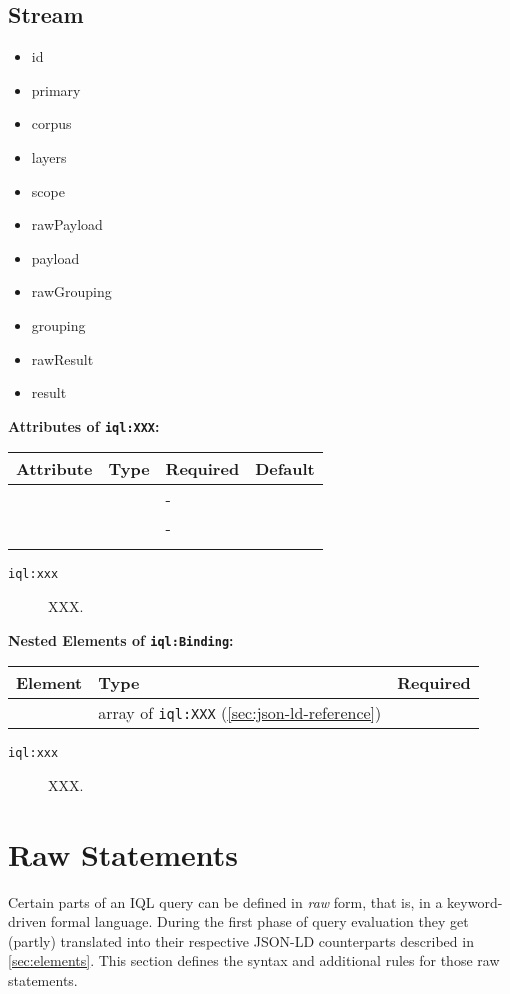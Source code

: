 \documentclass[11pt]{article}
\newcommand{\iql}{IQL\xspace}
\newcommand{\iqlns}{iql:}
\newcommand{\iqlType}[1]{\texttt{\iqlns#1}}
\newcommand{\attributes}[1]{\noindent\textbf{Attributes of \iqlType{#1}:}\newline\medskip}
\newcommand{\elements}[1]{\noindent\textbf{Nested Elements of \iqlType{#1}:}\newline\medskip}
\begin{document}
\subsection{Stream}
\label{sec:json-ld-stream}
\begin{itemize}
	\item id
	\item primary
	\item corpus
	\item layers
	\item scope
	\item rawPayload
	\item payload
	\item rawGrouping
	\item grouping
	\item rawResult
	\item result
\end{itemize}
\attributes{XXX}
\begin{tabular}{|p{}|p{}|p{}|p{}|}
	\hline
	\textbf{Attribute} & \textbf{Type} & \textbf{Required} & \textbf{Default} \\ 
	\hline
	\hline
	&  & - &  \\ 
	\hline 
	&  & - &  \\ 
	\hline 
	&  &  & \\ 
	\hline 
\end{tabular}
\begin{description}
	\item[\iqlType{xxx}] XXX.
\end{description}
\elements{Binding}
\begin{tabular}{|p{}|p{}|p{}|}
	\hline
	\textbf{Element} & \textbf{Type} & \textbf{Required} \\ 
	\hline
	\hline 
	& array of \iqlType{XXX} (\ref{sec:json-ld-reference}) &  \\ 
	\hline 
\end{tabular}
\begin{description}
	\item[\iqlType{xxx}] XXX.
\end{description}


\section{Raw Statements}
\label{sec:raw-statements}

Certain parts of an \iql query can be defined in \textit{raw} form, that is, in a keyword-driven formal language.
During the first phase of query evaluation they get (partly) translated into their respective JSON-LD counterparts described in \cref{sec:elements}.
This section defines the syntax and additional rules for those raw statements.
\end{document}
